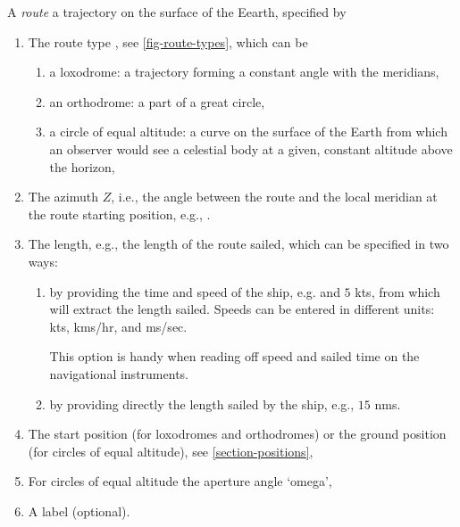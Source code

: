 \documentclass{ol-softwaremanual}
\begin{document}
A \textit{route} a trajectory on the surface of the Eearth, specified by 
\begin{enumerate}
  \item \label{item-route-type} The route type \cite{bowditch2002the}, see \cref{fig-route-types}, which can be 
  \begin{enumerate}
  \item a loxodrome: a trajectory forming a constant angle with the meridians,
  \item an orthodrome: a part of a great circle,
  \item  a circle of equal altitude: a curve on the surface of the Earth from which an observer would see a celestial body at a given, constant altitude above the horizon,
  \end{enumerate}
  \item \label{item-route-azimuth} The azimuth $Z$, i.e., the angle between the route  and the local meridian at the route starting position, e.g., .
  \item \label{item-route-length} The length, e.g., the length of the route sailed, which can be specified in two ways:
  \begin{enumerate}
  \item by providing the time and speed of the ship, e.g.   and $5$ \acp{kt}, from which  \thel will extract the length sailed. Speeds can be entered in different units: \acp{kt}, \acp{km}/\ac{hr},  and \acp{m}/\ac{sec}. 
  
  This option is handy when reading off speed and sailed time  on the navigational instruments. 
  \item by providing directly the length sailed by the ship, e.g.,  $15$ \acp{nm}. 
  


  \end{enumerate}

  \item \label{item-route-reference-position} The start position (for loxodromes and orthodromes) or the ground position (for circles of equal altitude), see \cref{section-positions},
  \item \label{item-route-aperture} For circles of equal altitude the aperture angle `omega',
  \item \label{item-route-label} A label (optional). 
\end{enumerate}
\end{document}
